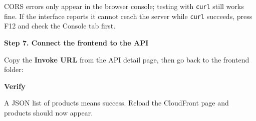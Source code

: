 CORS errors only appear in the browser console; testing with
\texttt{curl} still works fine. If the interface reports it cannot reach
the server while \texttt{curl} succeeds, press F12 and check the Console
tab first.

\vspace{0.5em}\noindent\textbf{Step 7. Connect the frontend to the
API}\par

Copy the \textbf{Invoke URL} from the API detail page, then go back to
the frontend folder:

\begin{Shaded}
\begin{Highlighting}[]
  \OperatorTok{\textgreater{}}
\OperatorTok{\textless{}}\OperatorTok{\textgreater{}}\NormalTok{/ }
 \OperatorTok{\textless{}}\OperatorTok{\textgreater{}}
\end{Highlighting}
\end{Shaded}

\vspace{0.5em}\noindent\textbf{Verify}\par

\begin{Shaded}
\begin{Highlighting}[]
\end{Highlighting}
\end{Shaded}

A JSON list of products means success. Reload the CloudFront page and
products should now appear.
